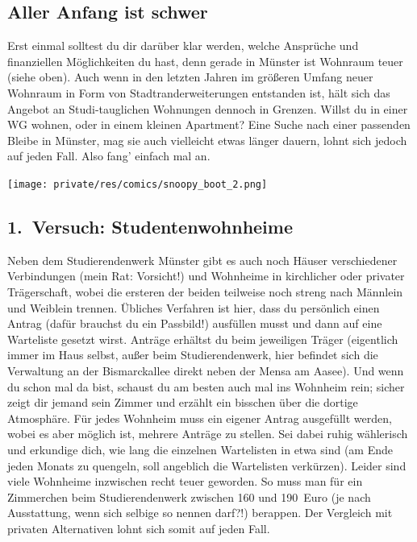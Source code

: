 \begin{multicols*}{2}
\subsection{Aller Anfang ist schwer}
Erst einmal solltest du dir darüber klar werden, welche Ansprüche und finanziellen Möglichkeiten du hast, denn gerade in Münster ist Wohnraum teuer (siehe oben).
Auch wenn in den letzten Jahren im größeren Umfang neuer Wohnraum in Form von Stadtranderweiterungen entstanden ist, hält sich das Angebot an Studi-tauglichen Wohnungen dennoch in Grenzen.
Willst du in einer WG wohnen, oder in einem kleinen Apartment?
Eine Suche nach einer passenden Bleibe in Münster, mag sie auch vielleicht etwas länger dauern, lohnt sich jedoch auf jeden Fall.
Also fang' einfach mal an.

\begin{center}
	\texttt{[image: private/res/comics/snoopy\_boot\_2.png]}
\end{center}

\subsection{1.~Versuch: Studentenwohnheime}
Neben dem Studierendenwerk Münster gibt es auch noch Häuser verschiedener Verbindungen (mein Rat: Vorsicht!) und Wohnheime in kirchlicher oder privater Trägerschaft, wobei die ersteren der beiden teilweise noch streng nach Männlein und Weiblein trennen.
Übliches Verfahren ist hier, dass du persönlich einen Antrag (dafür brauchst du ein Passbild!) ausfüllen musst und dann auf eine Warteliste gesetzt wirst.
Anträge erhältst du beim jeweiligen Träger (eigentlich immer im Haus selbst, außer beim Studierendenwerk, hier befindet sich die Verwaltung an der Bismarckallee direkt neben der Mensa am Aasee).
Und wenn du schon mal da bist, schaust du am besten auch mal ins Wohnheim rein; sicher zeigt dir jemand sein Zimmer und erzählt ein bisschen über die dortige Atmosphäre.
Für jedes Wohnheim muss ein eigener Antrag ausgefüllt werden, wobei es aber möglich ist, mehrere Anträge zu stellen.
Sei dabei ruhig wählerisch und erkundige dich, wie lang die einzelnen Wartelisten in etwa sind (am Ende jeden Monats zu quengeln, soll angeblich die Wartelisten verkürzen).
Leider sind viele Wohnheime inzwischen recht teuer geworden.
So muss man für ein Zimmerchen beim Studierendenwerk zwischen 160 und 190~Euro (je nach Ausstattung, wenn sich selbige so nennen darf?!) berappen.
Der Vergleich mit privaten Alternativen lohnt sich somit auf jeden Fall.


\end{multicols*}
